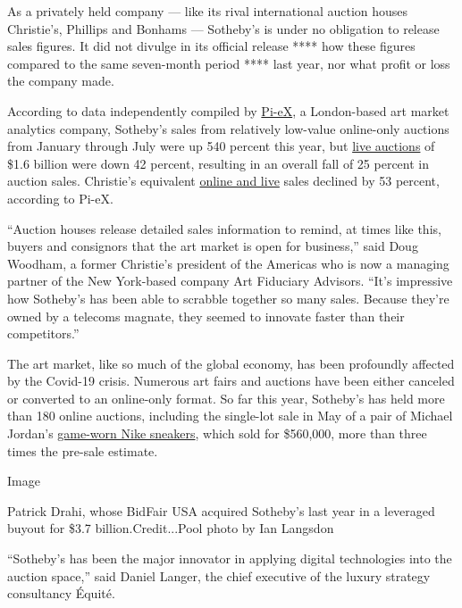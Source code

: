 As a privately held company --- like its rival international auction
houses Christie's, Phillips and Bonhams --- Sotheby's is under no
obligation to release sales figures. It did not divulge in its official
release **** how these figures compared to the same seven-month period
**** last year, nor what profit or loss the company made.

According to data independently compiled by
\href{https://pi-ex.co/}{Pi-eX}, a London-based art market analytics
company, Sotheby's sales from relatively low-value online-only auctions
from January through July were up 540 percent this year, but
\href{https://www.nytimes3xbfgragh.onion/2020/05/29/arts/design/sothebys-remote-auctions-coronavirus.html}{live
auctions} of \$1.6 billion were down 42 percent, resulting in an overall
fall of 25 percent in auction sales. Christie's equivalent
\href{https://www.nytimes3xbfgragh.onion/2020/07/10/arts/design/christies-auction.html}{online
and live} sales declined by 53 percent, according to Pi-eX.

``Auction houses release detailed sales information to remind, at times
like this, buyers and consignors that the art market is open for
business,'' said Doug Woodham, a former Christie's president of the
Americas who is now a managing partner of the New York-based company Art
Fiduciary Advisors. ``It's impressive how Sotheby's has been able to
scrabble together so many sales. Because they're owned by a telecoms
magnate, they seemed to innovate faster than their competitors.''

The art market, like so much of the global economy, has been profoundly
affected by the Covid-19 crisis. Numerous art fairs and auctions have
been either canceled or converted to an online-only format. So far this
year, Sotheby's has held more than 180 online auctions, including the
single-lot sale in May of a pair of Michael Jordan's
\href{https://www.nytimes3xbfgragh.onion/2020/05/18/sports/air-jordan-sneakers-auction-record.html}{game-worn
Nike sneakers}, which sold for \$560,000, more than three times the
pre-sale estimate.

Image

Patrick Drahi, whose BidFair USA acquired Sotheby's last year in a
leveraged buyout for \$3.7 billion.Credit...Pool photo by Ian Langsdon

``Sotheby's has been the major innovator in applying digital
technologies into the auction space,'' said Daniel Langer, the chief
executive of the luxury strategy consultancy Équité.

